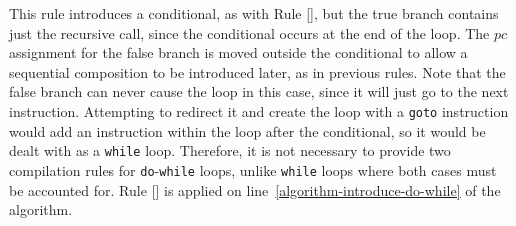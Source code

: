 This rule introduces a conditional, as with Rule
[], but the true branch contains
just the recursive call, since the conditional occurs at the end of
the loop.
The $pc$ assignment for the false branch is moved outside the
conditional to allow a sequential composition to be introduced later,
as in previous rules.
Note that the false branch can never cause the loop in this case,
since it will just go to the next instruction.
Attempting to redirect it and create the loop with a \texttt{goto}
instruction would add an instruction within the loop after the
conditional, so it would be dealt with as a \texttt{while} loop.
Therefore, it is not necessary to provide two compilation rules for
\texttt{do}-\texttt{while} loops, unlike \texttt{while} loops where
both cases must be accounted for.
Rule [] is applied on
line~\ref{algorithm-introduce-do-while} of the algorithm.

